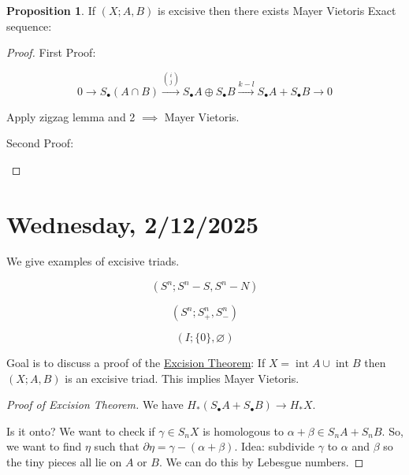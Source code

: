 \documentclass{article}
\theoremstyle{definition}
\newtheorem{proposition}[theorem]{Proposition}
\begin{document}
    \begin{proposition}
        If \((X;A,B)\) is excisive then there exists Mayer Vietoris Exact sequence:
    \end{proposition}

    \begin{proof}
        First Proof: 

        \[
            0 \to S_\bullet(A\cap B) \xrightarrow{\binom{i}{j}} S_\bullet A \oplus S_\bullet B \xrightarrow{k-l} S_\bullet A + S_\bullet B \to 0
        \]

        Apply zigzag lemma and 2 \(\implies\) Mayer Vietoris.

        Second Proof:

        \begin{center}
        \end{center}

    \end{proof}

    \section*{Wednesday, 2/12/2025}
    
    We give examples of excisive triads.

    \[
        (S^n; S^n - S, S^n - N)
    \]

    \[
        (S^n; S^n_+, S^n_-)
    \]

    \[
        (I; \{ 0 \}, \varnothing)
    \]

    Goal is to discuss a proof of the \underline{Excision Theorem}: If \(X = \operatorname{int} A \cup \operatorname{int} B\) then \((X; A, B)\) is an excisive triad. This implies Mayer Vietoris. 

    \begin{proof}
        [Proof of Excision Theorem]

        We have \(H_{\ast}(S_\bullet A + S_\bullet B) \to H_{\ast} X\).

        Is it onto? We want to check if \(\gamma\in S_n X\) is homologous to \(\alpha + \beta \in S_n A + S_n B\). So, we want to find \(\eta\) such that \(\partial \eta = \gamma - (\alpha + \beta)\). Idea: subdivide \(\gamma\) to \(\alpha\) and \(\beta\) so the tiny pieces all lie on \(A\) or \(B\). We can do this by Lebesgue numbers.   
    \end{proof}
\end{document}
